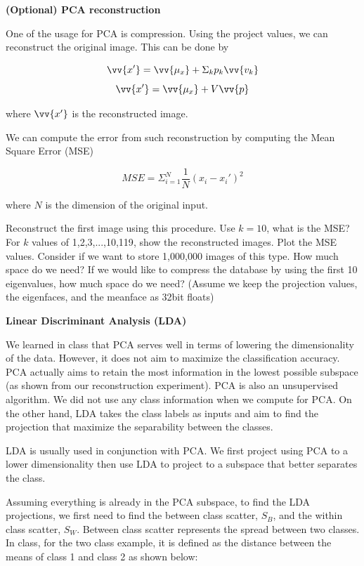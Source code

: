 \documentclass{article}
\newcounter{question}
\newcounter{oquestion}
\begin{document}
\textbf{(Optional) PCA reconstruction}

One of the usage for PCA is compression. Using the project values, we can reconstruct the original image. This can be done by

\begin{equation}
    \vv{x'} = \vv{\mu_x} + \Sigma_k p_k \vv{v_k}
\end{equation}
\begin{equation}
    \vv{x'} = \vv{\mu_x} + V\vv{p}
\end{equation}

where $\vv{x'}$ is the reconstructed image.

We can compute the error from such reconstruction by computing the Mean Square Error (MSE)

\begin{equation}
    MSE = \Sigma_{i=1}^N \frac{1}{N} (x_i - x_i')^2
\end{equation}

where $N$ is the dimension of the original input.

\oquestion Reconstruct the first image using this procedure. Use $k = 10$, what is the MSE?
\oquestion For $k$ values of {1,2,3,...,10,119}, show the reconstructed images. Plot the MSE values.
\oquestion Consider if we want to store 1,000,000 images of this type. How much space do we need? If we would like to compress the database by using the first 10 eigenvalues, how much space do we need? (Assume we keep the projection values, the eigenfaces, and the meanface as 32bit floats)

\textbf{Linear Discriminant Analysis (LDA)}

We learned in class that PCA serves well in terms of lowering the dimensionality of the data. However, it does not aim to maximize the classification accuracy. PCA actually aims to retain the most information in the lowest possible subspace (as shown from our reconstruction experiment). PCA is also an unsupervised algorithm. We did not use any class information when we compute for PCA. On the other hand, LDA takes the class labels as inputs and aim to find the projection that maximize the separability between the classes.

LDA is usually used in conjunction with PCA. We first project using PCA to a lower dimensionality then use LDA to project to a subspace that better separates the class.

Assuming everything is already in the PCA subspace, to find the LDA projections, we first need to find the between class scatter, $S_B$, and the within class scatter, $S_W$. Between class scatter represents the spread between two classes. In class, for the two class example, it is defined as the distance between the means of class 1 and class 2 as shown below:
\end{document}
